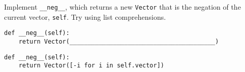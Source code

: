 \question Implement {\tt \_\_neg\_\_}, which returns a new {\tt Vector}
that is the negation of the current vector, {\tt self}. Try using list
comprehensions.
\begin{lstlisting}
def __neg__(self):
    return Vector(________________________________________)
\end{lstlisting}
\begin{solution}[0cm]
\begin{lstlisting}
def __neg__(self):
    return Vector([-i for i in self.vector])
\end{lstlisting}
\end{solution}
